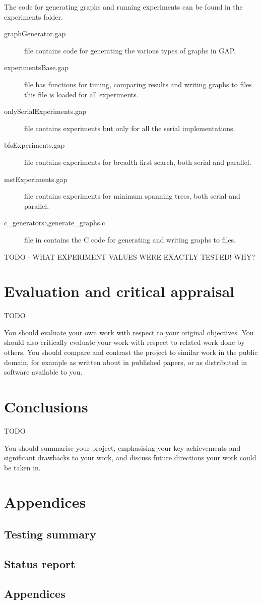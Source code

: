\documentclass{report}
\theoremstyle{plain}
\theoremstyle{definition}
\theoremstyle{remark}
\begin{document}
The code for generating graphs and running experiments can be found in the experiments folder.
\begin{description}
\item[graphGenerator.gap] file contains code for generating the various types of graphs in GAP.
\item[experimentsBase.gap] file has functions for timing, comparing results and writing graphs to files this file is loaded for all experiments.
\item[onlySerialExperiments.gap] file contains experiments but only for all the serial implementations.
\item[bfsExperiments.gap] file contains experiments for breadth first search, both serial and parallel.
\item[mstExperiments.gap] file contains experiments for minimum spanning trees, both serial and parallel.
\item[c\_generators$\backslash$generate\_graphs.c] file in contains the C code for generating and writing graphs to files.
\end{description}

TODO - WHAT EXPERIMENT VALUES WERE EXACTLY TESTED! WHY?

\chapter{Evaluation and critical appraisal}

TODO

You should evaluate your own work with respect to your original
objectives. You should also critically evaluate your work with respect to
related work done by others. You should compare and contrast the project
to similar work in the public domain, for example as written about in
published papers, or as distributed in software available to you.


\chapter{Conclusions}

TODO

You should summarise your project, emphasising your key achievements
and significant drawbacks to your work, and discuss future directions your
work could be taken in.

\chapter{Appendices}

\section{Testing summary}

\section{Status report}

\section{Appendices}



\end{document}

